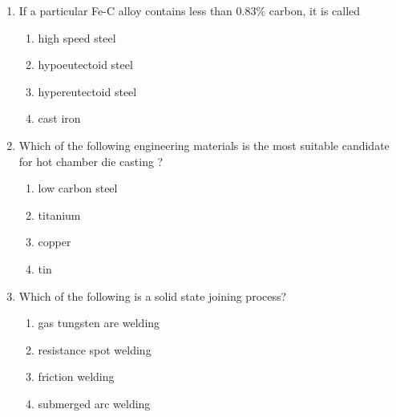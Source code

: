 \documentclass[journal]{IEEEtran}
\begin{document}
\begin{enumerate}
\bigskip
\item If a particular Fe-C alloy contains less than $ 0.83\% $ carbon, it is called
\begin{multicols}{2}
    \begin{enumerate}
        \item high speed steel
        \item hypoeutectoid steel
        \item hypereutectoid steel
        \item cast iron
    \end{enumerate}
\end{multicols}
\bigskip
\item Which of the following engineering materials is the most suitable candidate for hot chamber die casting ?
\begin{multicols}{2}
    \begin{enumerate}
        \item low carbon steel 
        \item titanium 
        \item copper 
        \item tin
    \end{enumerate}
\end{multicols}
\bigskip
\item Which of the following is a solid state joining  process?
\begin{multicols}{2}
    \begin{enumerate}
        \item gas tungsten are welding
        \item resistance spot welding
        \item friction welding 
        \item submerged arc welding 
    \end{enumerate}
\end{multicols}

\end{enumerate}
\end{document}

